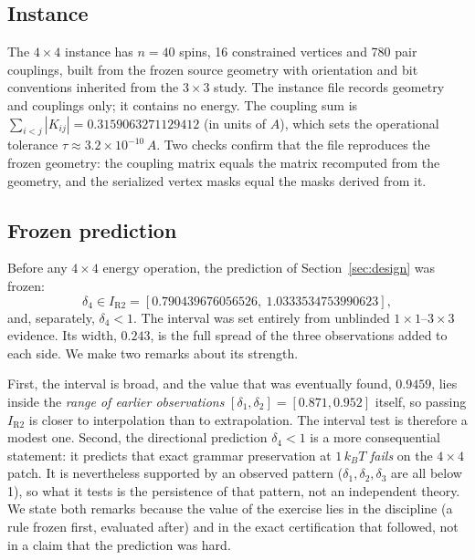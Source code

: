 \documentclass[11pt,a4paper]{article}
\theoremstyle{plain}
\theoremstyle{definition}
\theoremstyle{remark}
\newcommand{\kBT}{k_{B}T}
\newcommand{\intervalR}{I_{\mathrm{R2}}}
\begin{document}
\subsection{Instance}
The $4\times4$ instance has $n=40$ spins, 16 constrained vertices and 780 pair couplings, built from the frozen source geometry with orientation and bit conventions inherited from the $3\times3$ study. The instance file records geometry and couplings only; it contains no energy. The coupling sum is $\sum_{i<j}|K_{ij}|=0.3159063271129412$ (in units of $A$), which sets the operational tolerance $\tau\approx3.2\times10^{-10}\,A$. Two checks confirm that the file reproduces the frozen geometry: the coupling matrix equals the matrix recomputed from the geometry, and the serialized vertex masks equal the masks derived from it.

\subsection{Frozen prediction}
Before any $4\times4$ energy operation, the prediction of Section~\ref{sec:design} was frozen:
\[
\delta_4\in\intervalR=[0.790439676056526,\ 1.0333534753990623],
\]
and, separately, $\delta_4<1$. The interval was set entirely from unblinded $1\times1$--$3\times3$ evidence. Its width, $0.243$, is the full spread of the three observations added to each side. We make two remarks about its strength.

First, the interval is broad, and the value that was eventually found, $0.9459$, lies inside the \emph{range of earlier observations} $[\delta_1,\delta_2]=[0.871,0.952]$ itself, so passing $\intervalR$ is closer to interpolation than to extrapolation. The interval test is therefore a modest one. Second, the directional prediction $\delta_4<1$ is a more consequential statement: it predicts that exact grammar preservation at $1\,\kBT$ \emph{fails} on the $4\times4$ patch. It is nevertheless supported by an observed pattern ($\delta_1,\delta_2,\delta_3$ are all below 1), so what it tests is the persistence of that pattern, not an independent theory. We state both remarks because the value of the exercise lies in the discipline (a rule frozen first, evaluated after) and in the exact certification that followed, not in a claim that the prediction was hard.
\end{document}
